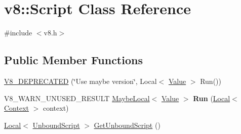 \hypertarget{classv8_1_1Script}{}\section{v8\+:\+:Script Class Reference}
\label{classv8_1_1Script}


{\ttfamily \#include $<$v8.\+h$>$}

\subsection*{Public Member Functions}
\begin{DoxyCompactItemize}
\item 
\mbox{\hyperlink{classv8_1_1Script_a4b52dd4dc71d2290095195414f6219d0}{V8\+\_\+\+D\+E\+P\+R\+E\+C\+A\+T\+ED}} (\char`\"{}Use maybe version\char`\"{}, Local$<$ \mbox{\hyperlink{classv8_1_1Value}{Value}} $>$ Run())
\item 
\mbox{\label{classv8_1_1Script_a37cfd598569f8b502d568a8a7a5a319b}} 
V8\+\_\+\+W\+A\+R\+N\+\_\+\+U\+N\+U\+S\+E\+D\+\_\+\+R\+E\+S\+U\+LT \mbox{\hyperlink{classv8_1_1MaybeLocal}{Maybe\+Local}}$<$ \mbox{\hyperlink{classv8_1_1Value}{Value}} $>$ {\bfseries Run} (\mbox{\hyperlink{classv8_1_1Local}{Local}}$<$ \mbox{\hyperlink{classv8_1_1Context}{Context}} $>$ context)
\item 
\mbox{\hyperlink{classv8_1_1Local}{Local}}$<$ \mbox{\hyperlink{classv8_1_1UnboundScript}{Unbound\+Script}} $>$ \mbox{\hyperlink{classv8_1_1Script_afac25cad452a61897c375c2b881e2070}{Get\+Unbound\+Script}} ()
\end{DoxyCompactItemize}
